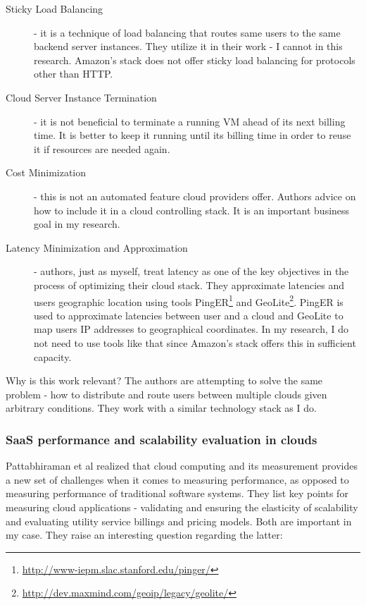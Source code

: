 \documentclass{uvamscse}
\begin{document}
\begin{description}
  \item[Sticky Load Balancing] - it is a technique of load balancing that routes same users to the same backend server instances. They utilize it in their work - I cannot in this research. Amazon's stack does not offer sticky load balancing for protocols other than HTTP.
  \item[Cloud Server Instance Termination] - it is not beneficial to terminate a running VM ahead of its next billing time. It is better to keep it running until its billing time in order to reuse it if resources are needed again.
  \item[Cost Minimization] - this is not an automated feature cloud providers offer. Authors advice on how to include it in a cloud controlling stack. It is an important business goal in my research.
  \item[Latency Minimization and Approximation] - authors, just as myself, treat latency as one of the key objectives in the process of optimizing their cloud stack. They approximate latencies and users geographic location using tools PingER\footnote{\url{http://www-iepm.slac.stanford.edu/pinger/}} and GeoLite\footnote{\url{http://dev.maxmind.com/geoip/legacy/geolite/}}. PingER is used to approximate latencies between user and a cloud and GeoLite to map users IP addresses to geographical coordinates. In my research, I do not need to use tools like that since Amazon's stack offers this in sufficient capacity.
\end{description}

Why is this work relevant? The authors are attempting to solve the same problem - how to distribute and route users between multiple clouds given arbitrary conditions. They work with a similar technology stack as I do.

\subsubsection{SaaS performance and scalability evaluation in clouds}

Pattabhiraman et al \cite{Models} realized that cloud computing and its measurement provides a new set of challenges when it comes to measuring performance, as opposed to measuring performance of traditional software systems. They list key points for measuring cloud applications - validating and ensuring the elasticity of scalability and evaluating utility service billings and pricing models. Both are important in my case. They raise an interesting question regarding the latter:
\end{document}
